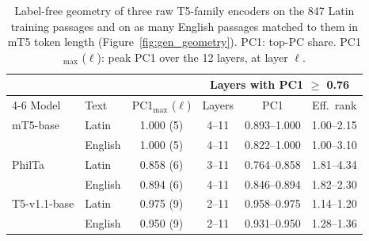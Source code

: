 \begin{table}[t]
\centering
\footnotesize
\setlength{\tabcolsep}{3pt}
\begin{tabular}{@{}llcccc@{}}
\toprule
& & & \multicolumn{3}{c}{Layers with PC1 $\ge$ 0.76} \\
\cmidrule(lr){4-6}
Model & Text & PC1$_{\max}$ ($\ell$) & Layers & PC1 & Eff.\ rank \\
\midrule
mT5-base & Latin & 1.000 (5) & 4--11 & 0.893--1.000 & 1.00--2.15 \\
 & English & 1.000 (5) & 4--11 & 0.822--1.000 & 1.00--3.10 \\
\addlinespace
PhilTa & Latin & 0.858 (6) & 3--11 & 0.764--0.858 & 1.81--4.34 \\
 & English & 0.894 (6) & 4--11 & 0.846--0.894 & 1.82--2.30 \\
\addlinespace
T5-v1.1-base & Latin & 0.975 (9) & 2--11 & 0.958--0.975 & 1.14--1.20 \\
 & English & 0.950 (9) & 2--11 & 0.931--0.950 & 1.28--1.36 \\
\bottomrule
\end{tabular}
\caption{Label-free geometry of three raw T5-family encoders on the 847 Latin training passages and on as many English passages matched to them in mT5 token length (Figure~\ref{fig:gen_geometry}). PC1: top-PC share. PC1$_{\max}$ ($\ell$): peak PC1 over the 12 layers, at layer $\ell$.}
\label{tab:gen_geometry}
\end{table}

